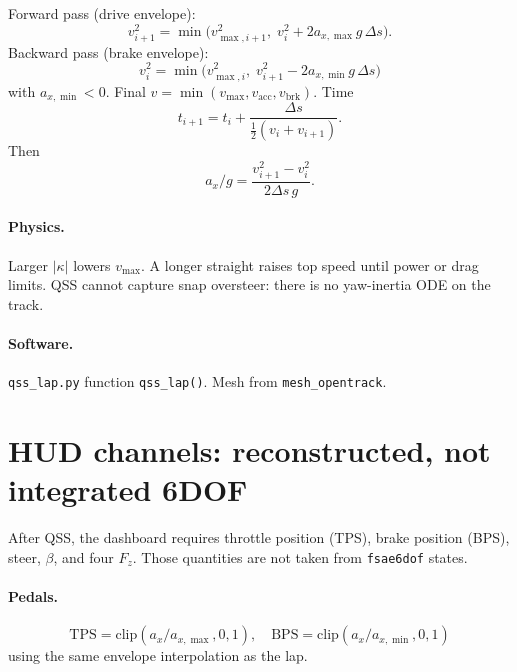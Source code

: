 \documentclass[11pt,letterpaper]{article}
\newcommand{\eng}[1]{\paragraph{Physics.} #1}
\newcommand{\codepath}[1]{\paragraph{Software.} #1}
\begin{document}
Forward pass (drive envelope):
\begin{equation}
  v_{i+1}^2 = \min\bigl(v_{\max,i+1}^2,\; v_i^2 + 2 a_{x,\max} g\,\Delta s\bigr).
\end{equation}
Backward pass (brake envelope):
\begin{equation}
  v_i^2 = \min\bigl(v_{\max,i}^2,\; v_{i+1}^2 - 2 a_{x,\min} g\,\Delta s\bigr)
\end{equation}
with $a_{x,\min}<0$. Final
$v=\min(v_{\max},v_{\mathrm{acc}},v_{\mathrm{brk}})$. Time
\begin{equation}
  t_{i+1}=t_i+\frac{\Delta s}{\tfrac12(v_i+v_{i+1})}.
\end{equation}
Then
\begin{equation}
  a_x/g = \frac{v_{i+1}^2-v_i^2}{2\Delta s\, g}.
\end{equation}

\eng{Larger $|\kappa|$ lowers $v_{\max}$. A longer straight raises top
speed until power or drag limits. QSS cannot capture snap oversteer:
there is no yaw-inertia ODE on the track.}

\codepath{\texttt{qss\_lap.py} function \texttt{qss\_lap()}. Mesh from
\texttt{mesh\_opentrack}.}

\section{HUD channels: reconstructed, not integrated 6DOF}
\label{sec:hud}

After QSS, the dashboard requires throttle position (TPS), brake
position (BPS), steer, $\beta$, and four $F_z$. Those quantities are
not taken from \texttt{fsae6dof} states.

\paragraph{Pedals.}
\[
  \mathrm{TPS}=\mathrm{clip}(a_x/a_{x,\max},0,1),\quad
  \mathrm{BPS}=\mathrm{clip}(a_x/a_{x,\min},0,1)
\]
using the same envelope interpolation as the lap.
\end{document}
